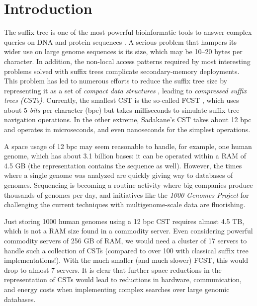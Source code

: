 
\section{Introduction}

The suffix tree \cite{Weiner1973} is one of the most powerful bioinformatic tools to
answer complex queries on DNA and protein sequences \cite{Gus97,Ohl13,MBCT15}.
A serious problem that hampers its wider use on large genome sequences is its
size, which may be 10--20 bytes per character. In addition, the non-local
access patterns required by most interesting problems solved with suffix trees
complicate secondary-memory deployments. This problem has led to numerous 
efforts to reduce the suffix tree size by representing it as a set of {\em 
compact data structures} \cite{Sadakane2007,Fischer2009a,Ohlebusch2009,Ohlebusch2010,Russo2011,Gog2011a,Abeliuk2013,Navarro2014a}, leading to 
{\em compressed suffix trees (CSTs)}. Currently, the smallest 
CST is the so-called FCST \cite{Russo2011,Navarro2014a}, which uses about 
5 {\em bits} per character (bpc) but takes milliseconds to simulate suffix 
tree navigation operations. In the other extreme, Sadakane's CST 
\cite{Sadakane2007} takes about 12 bpc and operates in microseconds, and even 
nanoseconds for the simplest operations.

A space usage of 12 bpc may seem reasonable to handle, for example, one human
genome, which has about 3.1 billion bases: it can be operated within a
RAM of 4.5 GB (the representation contains the sequence as well). However, the
times where a single genome was analyzed are quickly giving way to databases
of genomes. Sequencing is becoming a routine activity where big companies 
produce thousands of genomes per day, and initiatives like the {\em 1000 Genomes
Project} \cite{Rozowsky2011} for challenging the current techniques with
multigenome-scale data are fluorishing.

Just storing 1000 human genomes using a 12 bpc CST requires almost 4.5 TB, which
is not a RAM size found in a commodity server. Even considering powerful 
commodity servers of 256 GB of RAM, we would need a cluster of 17 servers to 
handle such a collection of CSTs (compared to over 100 with classical suffix
tree implementations!). With the much smaller (and much slower) FCST, this would
drop to almost 7 servers. It is clear that further space reductions in the 
representation of CSTs would lead to reductions in hardware, communication, 
and energy costs when implementing complex searches over large genomic 
databases.

